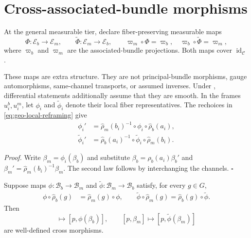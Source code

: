 \section{Cross-associated-bundle morphisms}
\label{sec:geo-cross-morphisms}

At the general measurable tier, declare fiber-preserving measurable maps
\begin{equation}
\Phi:\mathcal E_b\longrightarrow\mathcal E_m,
\qquad
\widetilde\Phi:\mathcal E_m\longrightarrow\mathcal E_b,
\qquad
\varpi_m\circ\Phi=\varpi_b,
\quad
\varpi_b\circ\widetilde\Phi=\varpi_m,
\label{eq:geo-cross-channel-map}
\end{equation}
where $\varpi_b$ and $\varpi_m$ are the associated-bundle projections.  Both maps cover
$\operatorname{id}_{\mathcal C}$. 

These maps are extra structure.  They are not principal-bundle morphisms, gauge automorphisms,
same-channel transports, or assumed inverses.  Under , differential
statements additionally assume that they are smooth.  In the frames $u_i^b,u_i^m$, let
$\phi_i$ and $\widetilde\phi_i$ denote their local fiber representatives.  The rechoices in
\eqref{eq:geo-local-reframing} give
\begin{align}
\phi_i'
&=\widehat\rho_m(b_i)^{-1}\circ\phi_i\circ\widehat\rho_b(a_i),
\label{eq:geo-phi-gauge-law}\\
\widetilde\phi_i'
&=\widehat\rho_b(a_i)^{-1}\circ\widetilde\phi_i\circ\widehat\rho_m(b_i).
\label{eq:geo-tildephi-gauge-law}
\end{align}

\noindent\emph{Proof.}
Write $\beta_m=\phi_i(\beta_b)$ and substitute
$\beta_b=\widehat\rho_b(a_i)\beta_b'$ and
$\beta_m'=\widehat\rho_m(b_i)^{-1}\beta_m$.  The second law follows by interchanging the
channels. \hfill$\square$

Suppose maps $\phi:\mathcal B_b\to\mathcal B_m$ and
$\widetilde\phi:\mathcal B_m\to\mathcal B_b$ satisfy, for every $g\in G$,
\begin{align}
\phi\circ\widehat\rho_b(g)&=\widehat\rho_m(g)\circ\phi,
\qquad
\widetilde\phi\circ\widehat\rho_m(g)=\widehat\rho_b(g)\circ\widetilde\phi.
\label{eq:geo-intertwining}
\end{align}
Then
\begin{equation}
[p,\beta_b]\longmapsto[p,\phi(\beta_b)],
\qquad
[p,\beta_m]\longmapsto[p,\widetilde\phi(\beta_m)]
\label{eq:geo-induced-cross-morphisms}
\end{equation}
are well-defined cross morphisms. 

